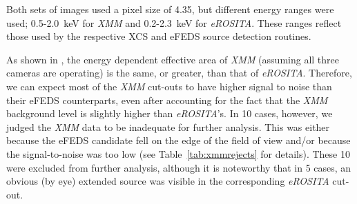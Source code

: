 \documentclass[fleqn,usenatbib]{mnras}
\begin{document}
Both sets of images used a pixel size of 4.35\arcsec, but different energy ranges were used; 0.5-2.0~keV for {\em XMM} and 0.2-2.3~keV for {\em eROSITA}. These ranges reflect those used by the respective XCS and eFEDS source detection routines.  

As shown in \cite{missionpaper}, the energy dependent effective area of {\em XMM} (assuming all three cameras are operating) is the same, or greater, than that of {\em eROSITA}. Therefore, we can expect most of the {\em XMM} cut-outs to have higher signal to noise than their eFEDS counterparts, even after accounting for the fact that the {\em XMM} background level is slightly higher than {\em eROSITA}'s. In 10 cases, however, we judged the {\em XMM} data to be inadequate for further analysis. This was either because the eFEDS candidate fell on the edge of the field of view and/or because the signal-to-noise was too low (see Table~\ref{tab:xmmrejects} for details). These 10 were excluded from further analysis, although it is noteworthy that in 5 cases, an obvious (by eye) extended source was visible in the corresponding {\em eROSITA} cut-out.

\end{document}
